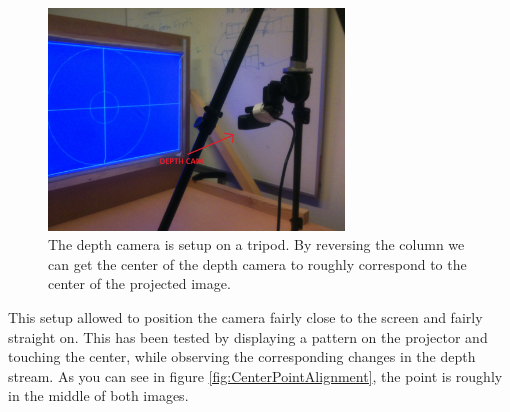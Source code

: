 \documentclass[]{article}
\begin{document}
\begin{figure}[hbtp]
    \centering
    \includegraphics[width=0.7\textwidth]{figures/tripodCamSetup.jpg}
    \caption{The depth camera is setup on a tripod. By reversing the column we can get the center of the depth camera to roughly correspond to the center of the projected image.}
    \label{fig:Tripod}
\end{figure}

This setup allowed to position the camera fairly close to the screen and fairly straight on. This has been tested by displaying a pattern on the projector and touching the center, while observing the corresponding changes in the depth stream. As you can see in figure \ref{fig:CenterPointAlignment}, the point is roughly in the middle of both images.
\end{document}
